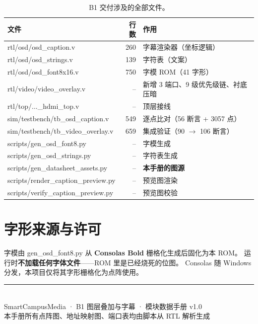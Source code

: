 \documentclass[10pt,a4paper]{article}
\newcommand{\sig}[1]{{\ttfamily\small #1}}
\begin{document}
\begin{table}[htbp]
\centering\small
\caption{B1 交付涉及的全部文件。}
\label{tab:files}
\renewcommand{\arraystretch}{1.22}
\begin{tabularx}{\linewidth}{@{}l r X@{}}
\toprule
\textbf{文件} & \textbf{行数} & \textbf{作用}\\
\midrule
\sig{rtl/osd/osd\_caption.v}    & 260 & 字幕渲染器（坐标逻辑）\\
\sig{rtl/osd/osd\_strings.v}    & 139 & 字符表（文案）\\
\sig{rtl/osd/osd\_font8x16.v}   & 750 & 字模 ROM（41 字形）\\
\sig{rtl/video/video\_overlay.v} & -- & 新增 3 端口、9 级优先级链、衬底压暗\\
\sig{rtl/top/...\_hdmi\_top.v}  & -- & 顶层接线\\
\midrule
\sig{sim/testbench/tb\_osd\_caption.v}   & 549 & 逐点比对（56 断言 + 3057 点）\\
\sig{sim/testbench/tb\_video\_overlay.v} & 659 & 集成验证（90 $\to$ 106 断言）\\
\midrule
\sig{scripts/gen\_osd\_font8.py}         & -- & 字模生成\\
\sig{scripts/gen\_osd\_strings.py}       & -- & 字符表生成\\
\sig{scripts/gen\_datasheet\_assets.py}  & -- & \textbf{本手册的图源}\\
\sig{scripts/render\_caption\_preview.py} & -- & 预览图渲染\\
\sig{scripts/verify\_caption\_preview.py} & -- & 预览图校验\\
\bottomrule
\end{tabularx}
\end{table}

\section{字形来源与许可}

字模由 \sig{gen\_osd\_font8.py} 从 \textbf{Consolas Bold} 栅格化生成后固化为本 ROM。
运行时\textbf{不加载任何字体文件}——ROM 里是已经烧死的位图。
Consolas 随 Windows 分发，本项目仅将其字形栅格化为点阵使用。

\vfill
\begin{center}
{\color{dsrule}\rule{0.6\linewidth}{0.4pt}}\\[4pt]
{\footnotesize\color{dsdim}\sffamily
SmartCampusMedia · B1 图层叠加与字幕 · 模块数据手册 v1.0\\
本手册所有点阵图、地址映射图、端口表均由脚本从 RTL 解析生成}
\end{center}
\end{document}
